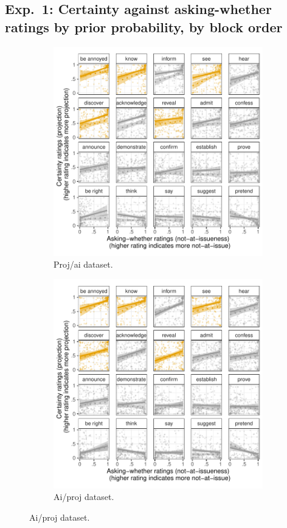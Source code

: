 \documentclass[11pt,fleqn]{article}
\newcommand{\6}{\mbox{$[\hspace*{-.6mm}[$}}
\newcommand{\9}{\mbox{$]\hspace*{-.6mm}]$}}
\begin{document}
\newpage

\subsection{Exp.~1: Certainty against asking-whether ratings by prior probability, by block order}

\begin{figure}[h!]
\centering
\begin{subfigure}[t]{0.49\textwidth}
\centering
\includegraphics[width=.9\textwidth]{../../results/exp1/graphs/SUP-projai-projection-by-ai-and-prior}
\caption{Proj/ai dataset.}
\end{subfigure} \hfill \begin{subfigure}[t]{0.49\textwidth}
\centering
\includegraphics[width=.9\textwidth]{../../results/exp1/graphs/SUP-aiproj-projection-by-ai-and-prior}
\caption{Ai/proj dataset.}
 \end{subfigure}
 

\end{figure}
\end{document}
